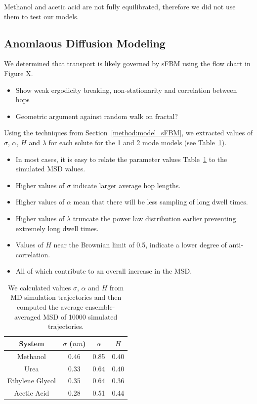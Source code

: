 \documentclass{article}
\begin{document}
  Methanol and acetic acid are not fully equilibrated, therefore we did not use them
  to test our models.

  \subsection{Anomlaous Diffusion Modeling}\label{section:sFBM}
  
  We determined that transport is likely governed by sFBM using the flow chart in
  Figure X.
  \begin{itemize}
    \item Show weak ergodicity breaking, non-stationarity and correlation between hops
    \item Geometric argument against random walk on fractal?
  \end{itemize}
  
  Using the techniques from Section~\ref{method:model_sFBM}, we extracted values 
  of $\sigma$, $\alpha$, $H$ and $\lambda$ for each solute for the 1 and 2 mode models 
  (see Table~\ref{table:sfbm_params}).
  \begin{itemize}
    \item In most cases, it is easy to relate the parameter values 
    Table~\ref{table:sfbm_params} to the simulated MSD values. 
  	\item Higher values of $\sigma$ indicate larger average hop lengths.
  	\item Higher values of $\alpha$ mean that there will be less sampling of 
  	long dwell times.
  	\item Higher values of $\lambda$ truncate the power law distribution earlier
  	preventing extremely long dwell times.
  	\item Values of $H$ near the Brownian limit of 0.5, indicate a lower degree
  	of anti-correlation.
  	\item All of which contribute to an overall increase in the MSD.
  \end{itemize}
  
  \begin{table}[h]
  \centering
  \begin{tabular}{cccc}
  \toprule
  System & $\sigma$ ($nm$) & $\alpha$ & $H$ \\
  \midrule
  Methanol & 0.46 & 0.85 & 0.40 \\
  Urea & 0.33 & 0.64 & 0.40 \\
  Ethylene Glycol & 0.35 & 0.64 & 0.36 \\
  Acetic Acid & 0.28 & 0.51 & 0.44 \\
  \bottomrule
  \end{tabular}
  \caption{We calculated values $\sigma$, $\alpha$ and $H$ from MD simulation
  trajectories and then computed the average ensemble-averaged MSD of 10000 
  simulated trajectories.}\label{table:sfbm_params}
  \end{table}
\end{document}
